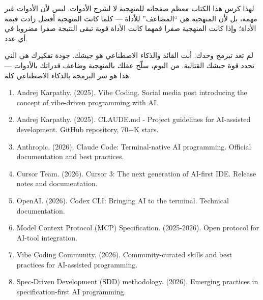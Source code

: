 لهذا كرس هذا الكتاب معظم صفحاته للمنهجية لا لشرح الأدوات. ليس لأن الأدوات غير مهمة، بل لأن المنهجية هي “المضاعف” للأداة — كلما كانت المنهجية أفضل زادت قيمة الأداة؛ وإذا كانت المنهجية صفرا فمهما كانت الأداة قوية تبقى النتيجة صفرا مضروبا في أي عدد.

لم تعد تبرمج وحدك. أنت القائد والذكاء الاصطناعي هو جيشك. جودة تفكيرك هي التي تحدد قوة جيشك القتالية. من اليوم، سلّح عقلك بالمنهجية وضاعف قدراتك بالأدوات — هذا هو سر البرمجة بالذكاء الاصطناعي كله.


\begin{enumerate}
  \item Andrej Karpathy. (2025). Vibe Coding. Social media post introducing the concept of vibe-driven programming with AI.
  \item Andrej Karpathy. (2025). CLAUDE.md - Project guidelines for AI-assisted development. GitHub repository, 70+K stars.
  \item Anthropic. (2026). Claude Code: Terminal-native AI programming. Official documentation and best practices.
  \item Cursor Team. (2026). Cursor 3: The next generation of AI-first IDE. Release notes and documentation.
  \item OpenAI. (2026). Codex CLI: Bringing AI to the terminal. Technical documentation.
  \item Model Context Protocol (MCP) Specification. (2025-2026). Open protocol for AI-tool integration.
  \item Vibe Coding Community. (2026). Community-curated skills and best practices for AI-assisted programming.
  \item Spec-Driven Development (SDD) methodology. (2026). Emerging practices in specification-first AI programming.
\end{enumerate}
